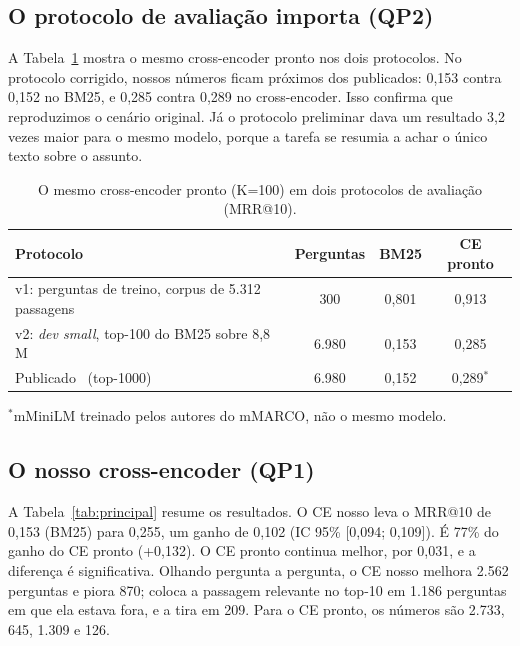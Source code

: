 \documentclass[12pt]{article}
\begin{document}
\subsection{O protocolo de avaliação importa (QP2)}

A Tabela~\ref{tab:protocolo} mostra o mesmo cross-encoder pronto nos dois protocolos. No
protocolo corrigido, nossos números ficam próximos dos publicados: 0,153 contra 0,152 no BM25,
e 0,285 contra 0,289 no cross-encoder. Isso confirma que reproduzimos o cenário original. Já o
protocolo preliminar dava um resultado 3,2 vezes maior para o mesmo modelo, porque a tarefa se
resumia a achar o único texto sobre o assunto.

\begin{table}[ht]
\centering
\caption{O mesmo cross-encoder pronto (K=100) em dois protocolos de avaliação (MRR@10).}
\label{tab:protocolo}
\begin{tabular}{lccc}
\toprule
Protocolo & Perguntas & BM25 & CE pronto \\
\midrule
v1: perguntas de treino, corpus de 5.312 passagens & 300 & 0,801 & 0,913 \\
v2: \textit{dev small}, top-100 do BM25 sobre 8,8 M & 6.980 & 0,153 & 0,285 \\
Publicado~\cite{bonifacio:2021} (top-1000) & 6.980 & 0,152 & 0,289$^{*}$ \\
\bottomrule
\end{tabular}

\smallskip
{\footnotesize $^{*}$mMiniLM treinado pelos autores do mMARCO, não o mesmo modelo.}
\end{table}

\subsection{O nosso cross-encoder (QP1)}

A Tabela~\ref{tab:principal} resume os resultados. O CE nosso leva o MRR@10 de 0,153 (BM25)
para 0,255, um ganho de 0,102 (IC 95\% [0,094; 0,109]). É 77\% do ganho do CE pronto (+0,132).
O CE pronto continua melhor, por 0,031, e a diferença é significativa. Olhando pergunta a
pergunta, o CE nosso melhora 2.562 perguntas e piora 870; coloca a passagem relevante no top-10
em 1.186 perguntas em que ela estava fora, e a tira em 209. Para o CE pronto, os números são
2.733, 645, 1.309 e 126.
\end{document}

